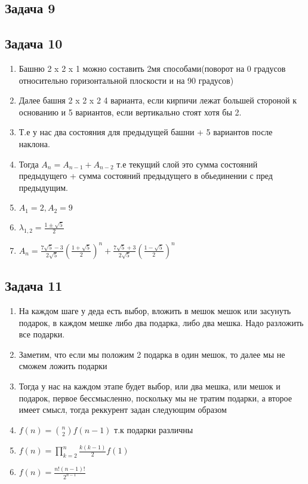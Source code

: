\documentclass[a4paper,12pt]{article}
\begin{document}
\subsection{Задача 9}

\subsection{Задача 10}
\begin{enumerate}
    \item Башню 2 x 2 x 1 можно составить 2мя способами(поворот на 0 градусов относительно горизонтальной плоскости и на 90 градусов)
    \item Далее башня 2 x 2 x 2  4 варианта, если кирпичи лежат большей стороной к основанию и 5 вариантов, если вертикально стоят хотя бы 2.
    \item Т.е у нас два состояния для предыдущей башни + 5 вариантов после наклона.
    \item Тогда $A_n=A_{n-1}+A_{n-2}$ т.е текущий слой это сумма состояний предыдущего + сумма состояний предыдущего в обьединении с пред предыдущим.
    \item $A_1 = 2, A_2 = 9$
    \item $\lambda_{1,2}=\frac{1\pm\sqrt{5}}{2}$
    \item $A_n = \frac{7\sqrt{5}-3}{2\sqrt{5}}\left(\frac{1+\sqrt{5}}{2}\right)^n + \frac{7\sqrt{5}+3}{2\sqrt{5}}\left(\frac{1-\sqrt{5}}{2}\right)^n$
\end{enumerate}

\subsection{Задача 11}
\begin{enumerate}
    \item На каждом шаге у деда есть выбор, вложить в мешок мешок или засунуть подарок, в каждом мешке либо два подарка, либо два мешка. Надо разложить все подарки.
    \item Заметим, что если мы положим 2 подарка в один мешок, то далее мы не сможем ложить подарки
    \item Тогда у нас на каждом этапе будет выбор, или два мешка, или мешок и подарок, первое бессмысленно, поскольку мы не тратим подарки, а второе имеет смысл, тогда реккурент задан следующим образом
    \item $f(n)=\binom{n}{2}f(n-1)$ т.к подарки различны
    \item $f(n)=\prod_{k=2}^{n}\frac{k(k-1)}{2}f(1)$
    \item $f(n)=\frac{n!(n-1)!}{2^{n-1}}$
\end{enumerate}
\end{document}
